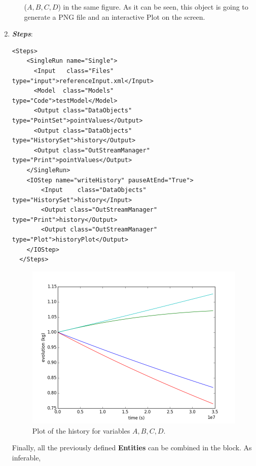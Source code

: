 \begin{enumerate}
\begin{itemize}
    ($A,B,C,D$) in the same figure. As it can be seen, this object is going to generate a PNG file and an interactive Plot on 
    the screen.
  \end{itemize}   
   \item \textbf{\textit{Steps}}:   
\begin{lstlisting}[style=XML,morekeywords={arg,extension,pauseAtEnd,overwrite}]
  <Steps>
    <SingleRun name="Single">
      <Input   class="Files"                        type="input">referenceInput.xml</Input>
      <Model  class="Models"                    type="Code">testModel</Model>
      <Output class="DataObjects"            type="PointSet">pointValues</Output>
      <Output class="DataObjects"            type="HistorySet">history</Output>
      <Output class="OutStreamManager" type="Print">pointValues</Output>
    </SingleRun>
    <IOStep name="writeHistory" pauseAtEnd="True">
        <Input    class="DataObjects"            type="HistorySet">history</Input>
        <Output class="OutStreamManager" type="Print">history</Output>
        <Output class="OutStreamManager" type="Plot">historyPlot</Output>
    </IOStep>
  </Steps>
\end{lstlisting}
 \begin{figure}[h!]
  \centering
  \includegraphics[scale=0.7]{pics/1-historyPlot_line-line-line-line.png}
  \caption{Plot of the history for variables $A,B,C,D$.}
  \label{fig:historyPlotLine}
 \end{figure}
   Finally, all the previously defined \textbf{Entities} can be combined in the  block. As inferable, 

\end{enumerate}
